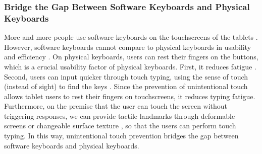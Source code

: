 \subsubsection{Bridge the Gap Between Software Keyboards and Physical Keyboards}

More and more people use software keyboards on the touchscreens of the tablets \cite{2018-Japanese}. However, software keyboards cannot compare to physical keyboards in usability \cite{2014-Differences, 2017-BlindType, 2010-NoLook, 2010-Eyes} and efficiency \cite{1991-Improving, 2011-Typing, 2010-Keyboard}.  On physical keyboards, users can rest their fingers on the buttons, which is a crucial usability factor of physical keyboards. First, it reduces fatigue \cite{2013-TapBoard}. Second, users can input quicker through touch typing, using the sense of touch (instead of sight) to find the keys \cite{2010-Warning, 1995-Use, 2011-Hierarchical, 2015-Haptic}. Since the prevention of unintentional touch allows tablet users to rest their fingers on touchscreens, it reduces typing fatigue. Furthermore, on the premise that the user can touch the screen without triggering responses, we can provide tactile landmarks through deformable screens \cite{Website-Tactus} or changeable surface texture \cite{2011-Stimtac, 2010-TeslaTouch, 2011-Enhancing}, so that the users can perform touch typing. In this way, unintentional touch prevention bridges the gap between software keyboards and physical keyboards.



